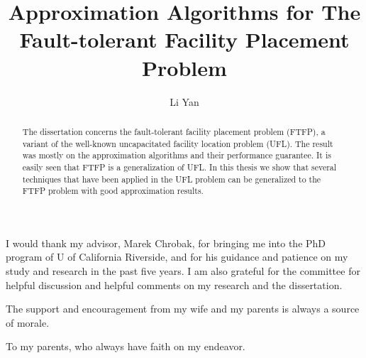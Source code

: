 \documentclass[oneside,final]{ucr}
\begin{document}

\title{Approximation Algorithms for The Fault-tolerant Facility Placement Problem}
\author{Li Yan}

\maketitle
\copyrightpage{}
\approvalpage{}


\begin{frontmatter}

\begin{acknowledgements}
  I would thank my advisor, Marek Chrobak, for bringing me into the
  PhD program of U of California Riverside, and for his guidance and
  patience on my study and research in the past five years. I am also
  grateful for the committee for helpful discussion and helpful
  comments on my research and the dissertation.

  The support and encouragement from my wife and my parents is always
  a source of morale.
\end{acknowledgements}

\begin{dedication}
\null\vfil
{\large
\begin{center}
  To my parents, who always have faith on my endeavor.
\end{center}}
\vfil\null
\end{dedication}

\begin{abstract}
  The dissertation concerns the fault-tolerant facility placement
  problem (FTFP), a variant of the well-known uncapacitated facility
  location problem (UFL). The result was mostly on the approximation
  algorithms and their performance guarantee. It is easily seen that
  FTFP is a generalization of UFL. In this thesis we show that several
  techniques that have been applied in the UFL problem can be
  generalized to the FTFP problem with good approximation results.
\end{abstract}

\tableofcontents
\listoffigures
\listoftables

\end{frontmatter}
\end{document}
